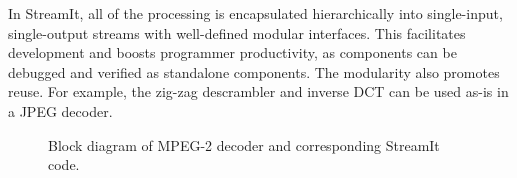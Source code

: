 
In StreamIt, all of the processing is encapsulated hierarchically into
single-input, single-output streams with well-defined modular
interfaces. This facilitates development and boosts programmer
productivity, as components can be debugged and verified as standalone
components. The modularity also promotes reuse. For example, the
zig-zag descrambler and inverse DCT can be used as-is in a JPEG decoder.

\begin{figure}[h]
  \begin{minipage}{\textwidth}
  \vspace{-1.1in}
  \vspace{-22pt}
  \caption{Block diagram of MPEG-2 decoder and corresponding StreamIt code.}
  \vspace{-12pt}
  \label{fig:dec-with-code}
  \end{minipage}
\end{figure}




